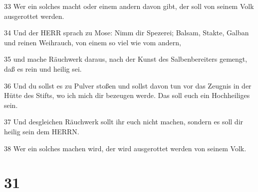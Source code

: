 \par 33 Wer ein solches macht oder einem andern davon gibt, der soll von seinem Volk ausgerottet werden.
\par 34 Und der HERR sprach zu Mose: Nimm dir Spezerei; Balsam, Stakte, Galban und reinen Weihrauch, von einem so viel wie vom andern,
\par 35 und mache Räuchwerk daraus, nach der Kunst des Salbenbereiters gemengt, daß es rein und heilig sei.
\par 36 Und du sollst es zu Pulver stoßen und sollst davon tun vor das Zeugnis in der Hütte des Stifts, wo ich mich dir bezeugen werde. Das soll euch ein Hochheiliges sein.
\par 37 Und desgleichen Räuchwerk sollt ihr euch nicht machen, sondern es soll dir heilig sein dem HERRN.
\par 38 Wer ein solches machen wird, der wird ausgerottet werden von seinem Volk.

\chapter{31}

